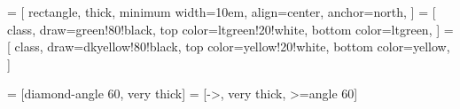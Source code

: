 \newcommand{\umlclass}[2]{\begin{minipage}{\maxof{\widthof{#1}+1em}{10em}}\parbox{\textwidth}{\centering #1}
\vspace*{-8pt} \hrule \vspace*{4pt} \parbox{\textwidth}{#2} \end{minipage}}
\newcommand{\umltype}[1]{$\ll$type$\gg$\\ #1}
\newcommand{\umlemptyclass}[1]{#1}

 = [
  rectangle,
  thick,
  minimum width=10em,
  align=center,
  anchor=north,
]
 = [
  class,
  draw=green!80!black,
  top color=ltgreen!20!white,
  bottom color=ltgreen,
]
 = [
  class,
  draw=dkyellow!80!black,
  top color=yellow!20!white,
  bottom color=yellow,
]

 = [diamond-angle 60, very thick]
 = [->, very thick, >=angle 60]


